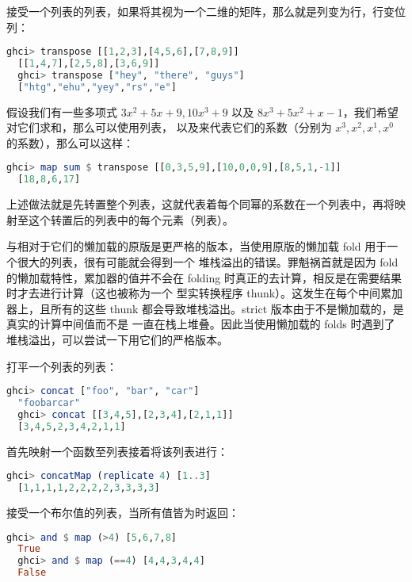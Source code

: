 \documentclass[./main.tex]{subfiles}
\begin{document}
接受一个列表的列表，如果将其视为一个二维的矩阵，那么就是列变为行，行变位列：

\begin{lstlisting}[language=Haskell]
  ghci> transpose [[1,2,3],[4,5,6],[7,8,9]]
  [[1,4,7],[2,5,8],[3,6,9]]
  ghci> transpose ["hey", "there", "guys"]
  ["htg","ehu","yey","rs","e"]
\end{lstlisting}

假设我们有一些多项式 $3x^2 + 5x + 9, 10x^3 + 9$ 以及 $ 8x^3 + 5x^2 + x - 1$，我们希望对它们求和，那么可以使用列表\acode{[0,3,5,9]}，
\acode{[10,0,0,9]}以及\acode{[8,5,1,-1]}来代表它们的系数（分别为 $x^3,x^2,x^1,x^0$ 的系数），那么可以这样：

\begin{lstlisting}[language=Haskell]
  ghci> map sum $ transpose [[0,3,5,9],[10,0,0,9],[8,5,1,-1]]
  [18,8,6,17]
\end{lstlisting}

上述做法就是先转置整个列表，这就代表着每个同幂的系数在一个列表中，再将映射至这个转置后的列表中的每个元素（列表）。

与相对于它们的懒加载的原版是更严格的版本，当使用原版的懒加载 fold 用于一个很大的列表，很有可能就会得到一个
堆栈溢出的错误。罪魁祸首就是因为 fold 的懒加载特性，累加器的值并不会在 folding 时真正的去计算，相反是在需要结果时才去进行计算（这也被称为一个
型实转换程序 thunk）。这发生在每个中间累加器上，且所有的这些 thunk 都会导致堆栈溢出。strict 版本由于不是懒加载的，是真实的计算中间值而不是
一直在栈上堆叠。因此当使用懒加载的 folds 时遇到了堆栈溢出，可以尝试一下用它们的严格版本。

打平一个列表的列表：

\begin{lstlisting}[language=Haskell]
  ghci> concat ["foo", "bar", "car"]
  "foobarcar"
  ghci> concat [[3,4,5],[2,3,4],[2,1,1]]
  [3,4,5,2,3,4,2,1,1]
\end{lstlisting}

首先映射一个函数至列表接着将该列表进行：

\begin{lstlisting}[language=Haskell]
  ghci> concatMap (replicate 4) [1..3]
  [1,1,1,1,2,2,2,2,3,3,3,3]
\end{lstlisting}

接受一个布尔值的列表，当所有值皆为时返回：

\begin{lstlisting}[language=Haskell]
  ghci> and $ map (>4) [5,6,7,8]
  True
  ghci> and $ map (==4) [4,4,3,4,4]
  False
\end{lstlisting}
\end{document}
